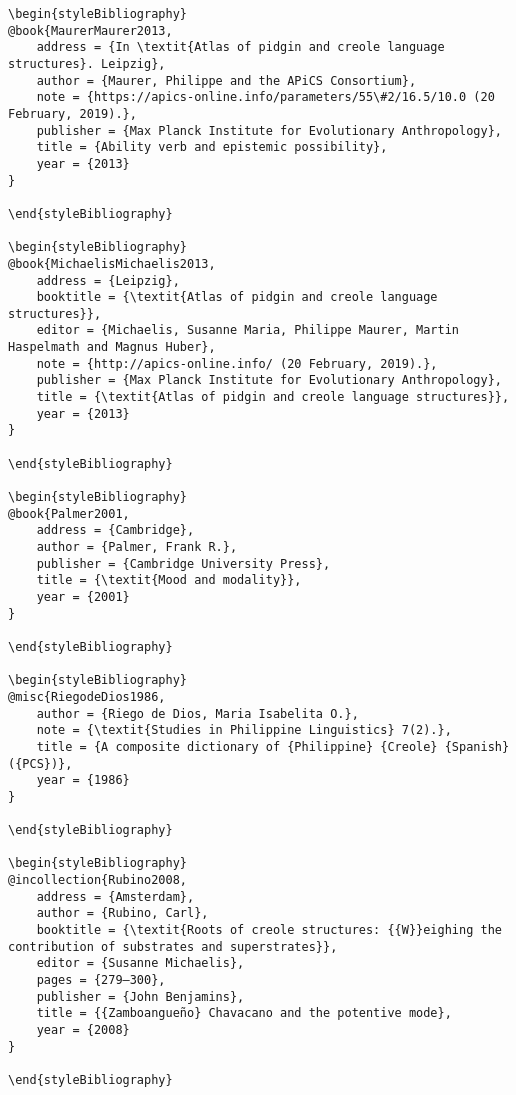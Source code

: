 \documentclass[output=paper]{langsci/langscibook}
\begin{document}
\begin{stylelsUnNumberedSection}
\begin{verbatim}
\begin{styleBibliography}
@book{MaurerMaurer2013,
	address = {In \textit{Atlas of pidgin and creole language structures}. Leipzig},
	author = {Maurer, Philippe and the APiCS Consortium},
	note = {https://apics-online.info/parameters/55\#2/16.5/10.0 (20 February, 2019).},
	publisher = {Max Planck Institute for Evolutionary Anthropology},
	title = {Ability verb and epistemic possibility},
	year = {2013}
}

\end{styleBibliography}

\begin{styleBibliography}
@book{MichaelisMichaelis2013,
	address = {Leipzig},
	booktitle = {\textit{Atlas of pidgin and creole language structures}},
	editor = {Michaelis, Susanne Maria, Philippe Maurer, Martin Haspelmath and Magnus Huber},
	note = {http://apics-online.info/ (20 February, 2019).},
	publisher = {Max Planck Institute for Evolutionary Anthropology},
	title = {\textit{Atlas of pidgin and creole language structures}},
	year = {2013}
}

\end{styleBibliography}

\begin{styleBibliography}
@book{Palmer2001,
	address = {Cambridge},
	author = {Palmer, Frank R.},
	publisher = {Cambridge University Press},
	title = {\textit{Mood and modality}},
	year = {2001}
}

\end{styleBibliography}

\begin{styleBibliography}
@misc{RiegodeDios1986,
	author = {Riego de Dios, Maria Isabelita O.},
	note = {\textit{Studies in Philippine Linguistics} 7(2).},
	title = {A composite dictionary of {Philippine} {Creole} {Spanish} ({PCS})},
	year = {1986}
}

\end{styleBibliography}

\begin{styleBibliography}
@incollection{Rubino2008,
	address = {Amsterdam},
	author = {Rubino, Carl},
	booktitle = {\textit{Roots of creole structures: {{W}}eighing the contribution of substrates and superstrates}},
	editor = {Susanne Michaelis},
	pages = {279–300},
	publisher = {John Benjamins},
	title = {{Zamboangueño} Chavacano and the potentive mode},
	year = {2008}
}

\end{styleBibliography}


\end{verbatim}
\end{stylelsUnNumberedSection}
\end{document}
